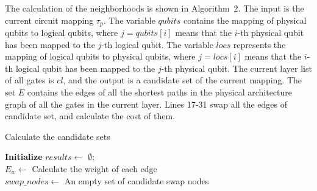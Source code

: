 \documentclass[journal]{IEEEtran}
\begin{document}
The calculation of the neighborhoods is shown in Algorithm~2. %
The input is the current circuit mapping $\tau_{p}$. The variable $qubits$ contains the mapping of physical qubits to logical qubits, where $ j = qubits [i] $ means that the $i$-th physical qubit has been mapped to the $j$-th logical qubit. The variable $ locs $ represents the mapping of logical qubits to physical qubits, where $ j = locs [i] $ means that the $i$-th logical qubit has been mapped to the $j$-th physical qubit.
The current layer list of all gates is $cl$, and the output is a candidate set of the current mapping. The set $E$ contains the edges of all the shortest paths in the physical architecture graph of all the gates in the current layer. Lines 17-31 swap all the edges of candidate set, and calculate the cost of them.
\begin{algorithm} [htbp]
	\caption{Calculate the candidate sets }  
	\LinesNumbered  
	\textbf{Initialize}  $results \leftarrow$ $\emptyset$;\\
					$E_{w} \leftarrow$ Calculate the weight of each edge\\
					$swap\_nodes \leftarrow $ An empty set of candidate swap nodes\\  
					
					

\end{algorithm}
\end{document}
